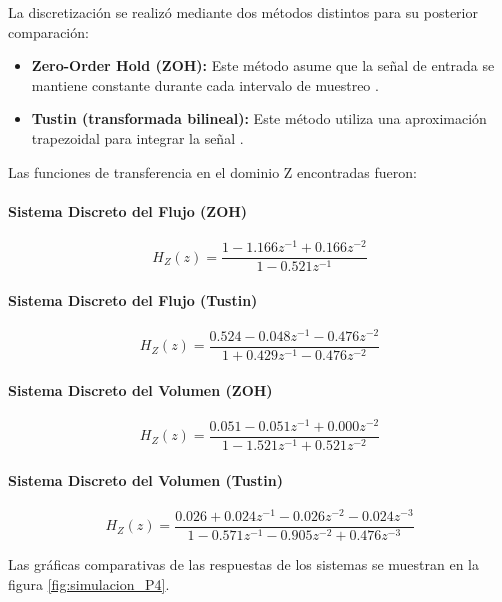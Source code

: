 \documentclass[journal]{IEEEtran}
\begin{document}
La discretización se realizó mediante dos métodos distintos para su posterior comparación:

\begin{itemize}
    \item \textbf{Zero-Order Hold (ZOH):} Este método asume que la señal de entrada se mantiene constante durante cada intervalo de muestreo \cite{mathworks_continuous_discrete_nodate}.
    \item \textbf{Tustin (transformada bilineal):} Este método utiliza una aproximación trapezoidal para integrar la señal \cite{mathworks_continuous_discrete_nodate}.
\end{itemize}

Las funciones de transferencia en el dominio Z encontradas fueron:

\paragraph{Sistema Discreto del Flujo (ZOH)}

$$H_Z(z) = \frac{1 - 1.166z^{-1} + 0.166z^{-2}}{1 - 0.521z^{-1}}$$

\paragraph{Sistema Discreto del Flujo (Tustin)}

$$H_Z(z) = \frac{0.524 - 0.048z^{-1} - 0.476z^{-2}}{1 + 0.429z^{-1} - 0.476z^{-2}}$$

\paragraph{Sistema Discreto del Volumen (ZOH)}

$$H_Z(z) = \frac{0.051 - 0.051z^{-1} + 0.000z^{-2}}{1 - 1.521z^{-1} + 0.521z^{-2}}$$

\paragraph{Sistema Discreto del Volumen (Tustin)}

$$H_Z(z) = \frac{0.026 + 0.024z^{-1} - 0.026z^{-2} - 0.024z^{-3}}{1 - 0.571z^{-1} - 0.905z^{-2} + 0.476z^{-3}}$$


Las gráficas comparativas de las respuestas de los sistemas se muestran en la figura \ref{fig:simulacion_P4}. 
\end{document}
